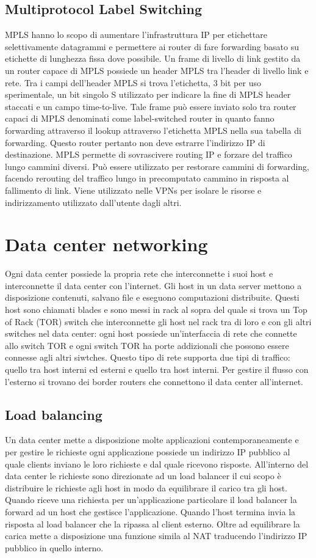 \subsection{Multiprotocol Label Switching}
MPLS hanno lo scopo di aumentare l'infrastruttura IP per etichettare selettivamente datagrammi e permettere ai router di fare forwarding basato su etichette di lunghezza fissa dove possibile. Un frame di 
livello di link gestito da un router capace di MPLS possiede un header MPLS tra l'header di livello link e rete. Tra i campi dell'header MPLS si trova l'etichetta, 3 bit per uso sperimentale, un bit singolo S utilizzato
per indicare la fine di MPLS header staccati e un campo time-to-live. Tale frame pu\`o essere inviato solo tra router capaci di MPLS denominati come label-switched router in quanto fanno forwarding attraverso
il lookup attraverso l'etichetta MPLS nella sua tabella di forwarding. Questo router pertanto non deve estrarre l'indirizzo IP di destinazione. MPLS permette di sovrascivere routing IP e forzare del traffico lungo 
cammini diversi. Pu\`o essere utilizzato per restorare cammini di forwarding, facendo rerouting del traffico lungo in precomputato cammino in risposta al fallimento di link. Viene utilizzato nelle VPNs per isolare
le risorse e indirizzamento utilizzato dall'utente dagli altri. 
\section{Data center networking}
Ogni data center possiede la propria rete che interconnette i suoi host e interconnette il data center con l'internet. Gli host in un data server mettono a disposizione contenuti, salvano file e eseguono 
computazioni distribuite. Questi host sono chiamati blades e sono messi in rack al sopra del quale si trova un Top of Rack (TOR) switch che interconnette gli host nel rack tra di loro e con gli altri switches nel
data center: ogni host possiede un'interfaccia di rete che connette allo switch TOR e ogni switch TOR ha porte addizionali che possono essere connesse agli altri siwtches. Questo tipo di rete supporta due tipi
di traffico: quello tra host interni ed esterni e quello tra host interni. Per gestire il flusso con l'esterno si trovano dei border routers che connettono il data center all'internet. 
\subsection{Load balancing}
Un data center mette a disposizione molte applicazioni contemporaneamente e per gestire le richieste ogni applicazione possiede un indirizzo IP pubblico al quale clients inviano le loro richieste e dal quale 
ricevono risposte. All'interno del data center le richieste sono direzionate ad un load balancer il cui scopo \`e distribuire le richieste agli host in modo da equilibrare il carico tra gli host. Quando riceve una 
richiesta per un'applicazione particolare il load balancer la forward ad un host che gestisce l'applicazione. Quando l'host termina invia la risposta al load balancer che la ripassa al client esterno.  Oltre ad 
equilibrare la carica mette a disposizione una funzione simila al NAT traducendo l'indirizzo IP pubblico in quello interno.

